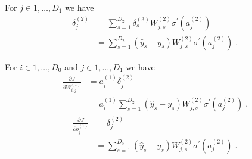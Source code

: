 \documentclass{article}
\begin{document}
For $j \in {1,\dots,D_{1}}$ we have
\begin{align*}
\delta^{(2)}_{j} & = \sum_{s=1}^{D_{2}}\delta^{(3)}_{s}W^{(2)}_{j,s} \sigma^{\prime} (a^{(2)}_{j})\\
& = \sum_{s=1}^{D_{2}}(\hat{y}_{s} - y_{s})W^{(2)}_{j,s}\sigma^{\prime} (a^{(2)}_{j})\; .
\end{align*}

For $i \in {1,\dots,D_{0}}$ and $j \in {1,\dots,D_{1}}$ we have
\begin{align*}
\frac{\partial J}{\partial W^{(1)}_{i,j}} & = a^{(1)}_{i}\delta^{(2)}_{j}\\
& = a^{(1)}_{i}\sum_{s=1}^{D_{2}}(\hat{y}_{s} - y_{s})W^{(2)}_{j,s}\sigma^{\prime} (a^{(2)}_{j})\; .
\end{align*}
\begin{align*}
\frac{\partial J}{\partial b^{(1)}_{j}} & = \delta^{(2)}_{j}\\
& = \sum_{s=1}^{D_{2}}(\hat{y}_{s} - y_{s})W^{(2)}_{j,s}\sigma^{\prime} (a^{(2)}_{j})\; .
\end{align*}
\end{document}
